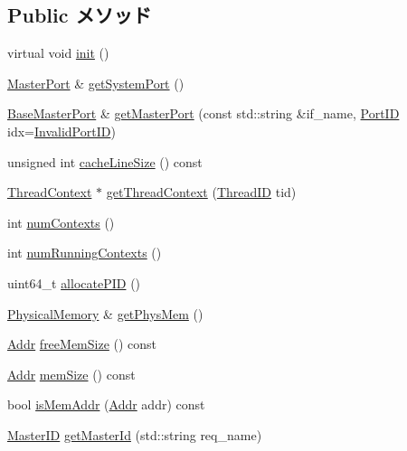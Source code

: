 \subsection*{Public メソッド}
\begin{DoxyCompactItemize}
\item 
virtual void \hyperlink{classSystem_a02fd73d861ef2e4aabb38c0c9ff82947}{init} ()
\item 
\hyperlink{classMasterPort}{MasterPort} \& \hyperlink{classSystem_ac19ed7d066a1932ab5b2309af9af350c}{getSystemPort} ()
\item 
\hyperlink{classBaseMasterPort}{BaseMasterPort} \& \hyperlink{classSystem_adc4e675e51defbdd1e354dac729d0703}{getMasterPort} (const std::string \&if\_\-name, \hyperlink{base_2types_8hh_acef4d7d41cb21fdc252e20c04cd7bb8e}{PortID} idx=\hyperlink{base_2types_8hh_a65bf40f138cf863f0c5e2d8ca1144126}{InvalidPortID})
\item 
unsigned int \hyperlink{classSystem_ac1f842b56d922c001dda5262b4cccbc6}{cacheLineSize} () const 
\item 
\hyperlink{classThreadContext}{ThreadContext} $\ast$ \hyperlink{classSystem_af349994bde91bd82c98f31e10c495cd1}{getThreadContext} (\hyperlink{base_2types_8hh_ab39b1a4f9dad884694c7a74ed69e6a6b}{ThreadID} tid)
\item 
int \hyperlink{classSystem_a905b96f2c022dcde596bdb806661bcae}{numContexts} ()
\item 
int \hyperlink{classSystem_af17f73eb71dfedfb91e4f39e7bb732ce}{numRunningContexts} ()
\item 
uint64\_\-t \hyperlink{classSystem_a402028e3641447d7638e44c37190c7e3}{allocatePID} ()
\item 
\hyperlink{classPhysicalMemory}{PhysicalMemory} \& \hyperlink{classSystem_af828d179222e0a3764213c270bfa4097}{getPhysMem} ()
\item 
\hyperlink{base_2types_8hh_af1bb03d6a4ee096394a6749f0a169232}{Addr} \hyperlink{classSystem_a1c6da3f76011beef47b9bb74c1a0ec19}{freeMemSize} () const 
\item 
\hyperlink{base_2types_8hh_af1bb03d6a4ee096394a6749f0a169232}{Addr} \hyperlink{classSystem_a21f1f1db9f5cb71e5e24790fbac5f30f}{memSize} () const 
\item 
bool \hyperlink{classSystem_a0faeadf06436f8123c7bda01087bb222}{isMemAddr} (\hyperlink{base_2types_8hh_af1bb03d6a4ee096394a6749f0a169232}{Addr} addr) const 
\item 
\hyperlink{request_8hh_ac366b729262fd8e7cbd3283da6f775cf}{MasterID} \hyperlink{classSystem_a906e073613d8d8e76e11c1bf9310a25c}{getMasterId} (std::string req\_\-name)

\end{DoxyCompactItemize}
